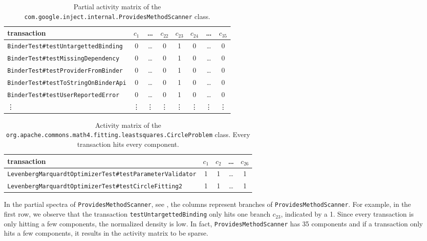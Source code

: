 \documentclass[twoside,a4paper,11pt]{memoir}
\begin{document}
\begin{table}[]
\scriptsize
\centering
\caption{Partial activity matrix of the \texttt{com.google.\-inject.\-internal.\-Provides\-Method\-Scanner} class.}
\label{tab:providesmethodscanner}
\begin{tabular}{l|ccccccc}
transaction & $c_1$ & \dots & $c_{22}$ & $c_{23}$ & $c_{24}$ & \dots & $c_{35}$ \\ \hline
\texttt{BinderTest\#testUntargettedBinding} & 0 & \dots & 0 & 1 & 0 & \dots & 0 \\
\texttt{BinderTest\#testMissingDependency} & 0 & \dots & 0 & 1 & 0 & \dots & 0 \\
\texttt{BinderTest\#testProviderFromBinder} & 0 & \dots & 0 & 1 & 0 & \dots & 0 \\
\texttt{BinderTest\#testToStringOnBinderApi} & 0 & \dots & 0 & 1 & 0 & \dots & 0 \\
\texttt{BinderTest\#testUserReportedError} & 0 & \dots & 0 & 1 & 0 & \dots & 0 \\
\vdots & \vdots & \vdots & \vdots & \vdots & \vdots & \vdots & \vdots
\end{tabular}
\end{table}

\begin{table}[]
\scriptsize
\centering
\caption{Activity matrix of the \texttt{org.apache.commons.math4.fitting.least\-squares.Circle\-Problem} class. Every transaction hits every component.}
\label{tab:circleproblem}
\begin{tabular}{l|cccc}
transaction & $c_1$ & $c_2$ & \dots & $c_{26}$ \\ \hline
\texttt{LevenbergMarquardtOptimizerTest\#testParameterValidator} & 1 & 1 & \dots & 1 \\
\texttt{LevenbergMarquardtOptimizerTest\#testCircleFitting2} & 1 & 1 & \dots & 1
\end{tabular}
\end{table}

In the partial spectra of \texttt{Provides\-Method\-Scanner}, see , the columns represent branches of \texttt{Provides\-Method\-Scanner}.
For example, in the first row, we observe that the transaction \texttt{test\-Untargetted\-Binding} only hits one branch $c_{23}$, indicated by a 1.
Since every transaction is only hitting a few components, the normalized density is low.
In fact, \texttt{Provides\-Method\-Scanner} has 35 components and if a transaction only hits a few components, it results in the activity matrix to be sparse.
\end{document}
